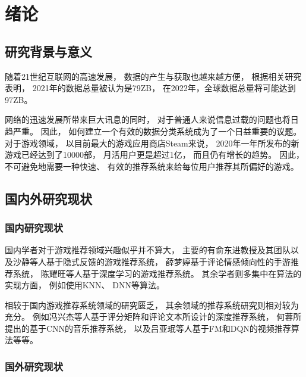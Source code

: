 \section{绪论}

\subsection{研究背景与意义}

随着21世纪互联网的高速发展，
数据的产生与获取也越来越方便，
根据相关研究表明\cite{arnevonseeTotalDataVolume2021}，
2021年的数据总量被认为是79ZB，
在2022年，全球数据总量将可能达到97ZB。

网络的迅速发展所带来巨大讯息的同时，
对于普通人来说信息过载的问题也将日趋严重。
因此，
如何建立一个有效的数据分类系统成为了一个日益重要的议题。
对于游戏领域，%
以目前最大的游戏应用商店Steam来说，
2020年一年所发布的新游戏已经达到了10000部，
月活用户更是超过1亿，
而且仍有增长的趋势。
因此，
不可避免地需要一种快速、
有效的推荐系统来给每位用户推荐其所偏好的游戏。

\subsection{国内外研究现状}

\subsubsection{国内研究现状}

国内学者对于游戏推荐领域兴趣似乎并不算大，
主要的有俞东进教授及其团队\cite{yuJiYuYinShiFanKuiShuJuDeGeXingHuaYouXiTuiJian2018}以及沙静等人\cite{shaJiYuYinShiFanKuiDeGeXingHuaYouXiTuiJianFangFa2021}基于隐式反馈的游戏推荐系统，
薛梦婷\cite{xieJiYuZhongWenPingLunQingGanQingXiangXingFenXiDeShouYouTuiJianYanJiu2017}基于评论情感倾向性的手游推荐系统，
陈耀旺\cite{chenJiYuShenDuXueXiDeGeXingHuaWangBaYouXiTuiJian2019}等人基于深度学习的游戏推荐系统。
其余学者则多集中在算法的实现方面，
例如使用KNN、
DNN等算法。

相较于国内游戏推荐系统领域的研究匮乏，
其余领域的推荐系统研究则相对较为充分。
例如冯兴杰等人\cite{fengJiYuPingFenJuZhenYuPingLunWenBenDeShenDuTuiJianMoXing2020}基于评分矩阵和评论文本所设计的深度推荐系统，
何蓉\cite{heJiYuJuanJiShenJingWangLuoDeYinLeTuiJianXiTong2019}所提出的基于CNN的音乐推荐系统，
以及吕亚珉\cite{luJiYuFMYuDQNJieHeDeShiPinTuiJianSuanFa2021}等人基于FM和DQN的视频推荐算法等等。

\subsubsection{国外研究现状}

